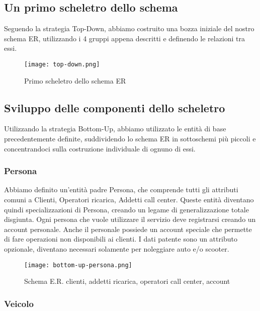 \documentclass{article}
\begin{document}
\subsection{Un primo scheletro dello schema}

Seguendo la strategia Top-Down, abbiamo costruito una bozza iniziale del nostro schema ER, utilizzando i 4 gruppi appena descritti e definendo le relazioni tra essi.

\begin{figure}[H]
    \centering
    \texttt{[image: top-down.png]}
    \caption{Primo scheletro dello schema ER}
    \label{fig:top-down}
\end{figure}


\subsection{Sviluppo delle componenti dello scheletro}

Utilizzando la strategia Bottom-Up, abbiamo utilizzato le entità di base precedentemente definite, suddividendo lo schema ER in sottoschemi più piccoli e concentrandoci sulla costruzione individuale di ognuno di essi.

\subsubsection{Persona}

Abbiamo definito un'entità padre Persona, che comprende tutti gli attributi comuni a Clienti, Operatori ricarica, Addetti call center. Queste entità diventano quindi specializzazioni di Persona, creando un legame di generalizzazione totale disgiunta. Ogni persona che vuole utilizzare il servizio deve registrarsi creando un account personale. Anche il personale possiede un account speciale che permette di fare operazioni non disponibili ai clienti.
I dati patente sono un attributo opzionale, diventano necessari solamente per noleggiare auto e/o scooter.

\begin{figure}[H]
    \centering
    \texttt{[image: bottom-up-persona.png]}
    \caption{Schema E.R. clienti, addetti ricarica, operatori call center, account}
    \label{fig:bottom-up-persona}
\end{figure}

\subsubsection{Veicolo}
\end{document}
